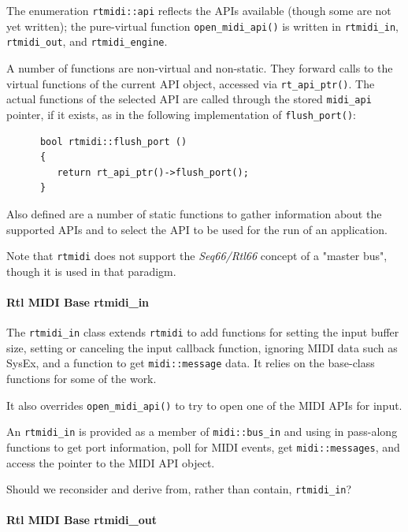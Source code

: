    The enumeration \texttt{rtmidi::api} reflects the APIs available
   (though some are not yet written); the pure-virtual function
   \texttt{open\_midi\_api()} is written in
   \texttt{rtmidi\_in}, \texttt{rtmidi\_out}, and \texttt{rtmidi\_engine}.

   A number of functions are non-virtual and non-static.
   They forward calls to the virtual functions of the current API object,
   accessed via \texttt{rt\_api\_ptr()}.
   The actual functions of the selected API are called through the stored
   \texttt{midi\_api} pointer, if it exists, as in the following
   implementation of \texttt{flush\_port()}:

   \begin{verbatim}
      bool rtmidi::flush_port ()
      {
         return rt_api_ptr()->flush_port();
      }
   \end{verbatim}

   Also defined are a number of static functions to gather information
   about the supported APIs and to select the API to be used for the
   run of an application.

   Note that \texttt{rtmidi} does not support the \textsl{Seq66/Rtl66}
   concept of a "master bus", though it is used in that paradigm.

\paragraph{Rtl MIDI Base rtmidi\_in}
\label{paragraph:rtl_midi_rtmidi_in}

   The \texttt{rtmidi\_in} class extends \texttt{rtmidi} to
   add functions for setting the input buffer size, setting or canceling
   the input callback function, ignoring MIDI data such as SysEx,
   and a function to get \texttt{midi::message} data.
   It relies on the base-class functions for some of the work.

   It also overrides \texttt{open\_midi\_api()} to try to open
   one of the MIDI APIs for input.

   An \texttt{rtmidi\_in} is provided as a member of \texttt{midi::bus\_in}
   and using in pass-along functions to get port information, poll for MIDI
   events, get \texttt{midi::messages}, and access the pointer to the
   MIDI API object.

   Should we reconsider and derive from, rather than contain,
   \texttt{rtmidi\_in}?

\paragraph{Rtl MIDI Base rtmidi\_out}
\label{paragraph:rtl_midi_rtmidi_out}

